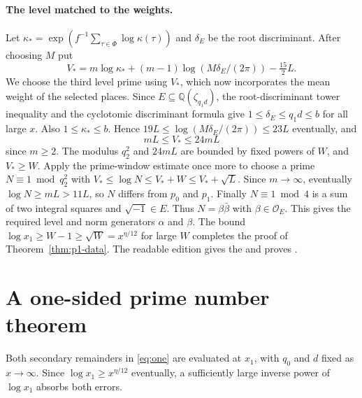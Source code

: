 \paragraph{The level matched to the weights.}
Let $\kappa_*=\exp(f^{-1}\sum_{\tau\in\Phi}\log\kappa(\tau))$ and
$\delta_E$ be the root discriminant. After choosing $M$ put
\[
 V_*=m\log\kappa_*+(m-1)\log(M\delta_E/(2\pi))
                    -\tfrac{15}{2}L .
\]
We choose the third level prime using $V_*$, which now incorporates the mean weight of the selected places. Since
$E\subseteq\mathbb Q(\zeta_{q_1d})$, the root-discriminant tower
inequality and the cyclotomic discriminant formula give
$1\le\delta_E\le q_1d\le b$ for all large $x$. Also
$1\le\kappa_*\le b$. Hence
$19L\le\log(M\delta_E/(2\pi))\le23L$ eventually, and
\[
 mL\le V_*\le24mL
\]
since $m\ge2$. The modulus $q_2^2$ and $24mL$ are bounded by fixed
powers of $W$, and $V_*\ge W$. Apply the prime-window estimate once
more to choose a prime $N\equiv1\bmod q_2^2$ with
$V_*\le\log N\le V_*+W\le V_*+\sqrt L$.
Since $m\to\infty$, eventually $\log N\ge mL>11L$, so $N$ differs from $p_0$ and $p_1$. Finally $N\equiv1\bmod4$ is a sum of two integral squares and
$\sqrt{-1}\in E$. Thus $N=\beta\bar\beta$ with
$\beta\in\mathcal O_E$. This gives the required level and norm generators $\alpha$ and $\beta$. The bound $\log x_1\ge W-1\ge\sqrt W=x^{\eta/12}$ for large $W$ completes the proof of Theorem~\ref{thm:p1-data}.
The readable edition gives the  and
proves .

\section{A one-sided prime number theorem}\label{sec:from-data}
Both secondary remainders in \eqref{eq:one} are evaluated at \(x_1\), with
\(q_0\) and \(d\) fixed as \(x\to\infty\). Since \(\log x_1\ge x^{\eta/12}\)
eventually, a sufficiently large inverse power of \(\log x_1\) absorbs both errors.

